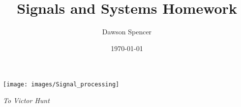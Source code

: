     \title{Signals and Systems Homework}
    \author{Dawson Spencer}
    \date{\today}
    \maketitle

    \begin{center}
        \texttt{[image: images/Signal\_processing]}
    \end{center}

    \vspace{1em}

    \begin{center}
        \textit{To Victor Hunt}
    \end{center}

